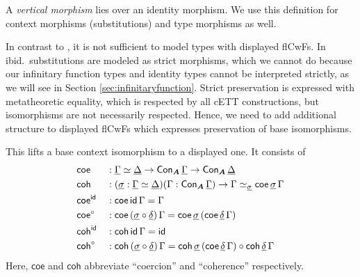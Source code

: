 \documentclass[sigplan,review,anonymous]{acmart}\settopmatter{printfolios=true,printccs=false,printacmref=false}
\newcommand{\bA}{\boldsymbol{A}}
\newcommand{\ul}[1]{\underline{#1}}
\newcommand{\ulGamma}{\ul{\Gamma}}
\newcommand{\ulDelta}{\ul{\Delta}}
\newcommand{\uldelta}{\ul{\delta}}
\newcommand{\ulsigma}{\ul{\sigma}}
\newcommand{\coe}{\mathsf{coe}}
\newcommand{\coh}{\mathsf{coh}}
\begin{document}
\begin{definition} A \emph{vertical morphism} lies over an identity morphism. We use this definition for context morphisms (substitutions) and type morphisms as well.
\end{definition}

In contrast to \cite{kaposi2019constructing}, it is not sufficient to model
types with displayed flCwFs. In ibid.\ substitutions are modeled as strict
morphisms, which we cannot do because our infinitary function types and identity
types cannot be interpreted strictly, as we will see in Section
\ref{sec:infinitaryfunction}. Strict preservation is expressed with metatheoretic equality, which
is respected by all cETT constructions, but isomorphisms are not necessarily
respected. Hence, we need to add additional structure to displayed flCwFs which
expresses preservation of base isomorphisms.

\begin{definition} This lifts a base context isomorphism to a displayed one. It consists of
\begin{alignat*}{3}
  & \coe &&: \ulGamma \simeq \ulDelta \ra \Con_{\bA}\,\ulGamma \ra \Con_{\bA}\,\ulDelta\\
  & \coh &&: (\ulsigma : \ulGamma \simeq \ulDelta)(\Gamma : \Con_{\bA}\,\ulGamma)
           \ra \Gamma \simeq_{\ulsigma} \coe\,\ulsigma\,\Gamma\\
  & \coe^{\id} && : \coe\,\id\,\Gamma = \Gamma\\
  & \coe^{\circ} && : \coe\,(\ulsigma\circ\uldelta)\,\Gamma = \coe\,\ulsigma\,(\coe\,\uldelta\,\Gamma)\\
  & \coh^{\id} && : \coh\,\id\,\Gamma = \id\\
  & \coh^{\circ} && : \coh\,(\ulsigma\circ\uldelta)\,\Gamma = \coh\,\ulsigma\,(\coe\,\uldelta\,\Gamma)
          \circ \coh\,\uldelta\,\Gamma
\end{alignat*}
Here, $\coe$ and $\coh$ abbreviate ``coercion'' and ``coherence'' respectively.
\end{definition}
\end{document}
